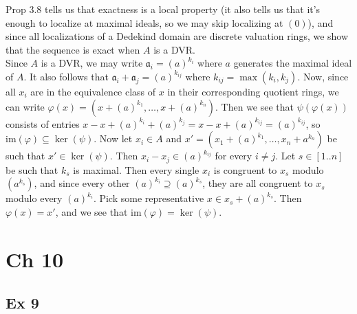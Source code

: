 \documentclass{article}
\let\temp\phi
\let\phi\varphi
\let\varphi\temp
\theoremstyle{definition}
\newcommand{\im}{\text{im}}
\begin{document}
Prop 3.8 tells us that exactness is a local property (it also tells us that
it's enough to localize at maximal ideals, so we may skip localizing at $(0)$),
and since all localizations of a Dedekind domain are discrete valuation rings,
we show that the sequence is exact when $A$ is a DVR. \\

Since $A$ is a DVR, we may write $\mathfrak{a}_i = (a)^{k_i}$ where $a$
generates the maximal ideal of $A$. It also follows that $\mathfrak{a}_i +
\mathfrak{a}_j = (a)^{k_{ij}}$ where $k_{ij} = \max(k_i, k_j)$. Now, since all
$x_i$ are in the equivalence class of $x$ in their corresponding quotient
rings, we can write $\phi(x) = (x + (a)^{k_1}, \ldots, x + (a)^{k_n})$. Then we
see that $\psi(\phi(x))$ consists of entries $x - x + (a)^{k_i} + (a)^{k_j} = x
- x + (a)^{k_{ij}} = (a)^{k_{ij}}$, so $\im(\phi) \subseteq \ker(\psi)$. Now
let $x_i \in A$ and $x' = (x_1 + (a)^{k_1}, \ldots, x_n + a^{k_n})$ be such
that $x' \in \ker(\psi)$. Then $x_i - x_j \in (a)^{k_{ij}}$ for every $i \not =
j$. Let $s \in [1..n]$ be such that $k_s$ is maximal. Then every single $x_i$
is congruent to $x_s$ modulo $(a^{k_s})$, and since every other $(a)^{k_i}
\supseteq (a)^{k_s}$, they are all congruent to $x_s$ modulo every $(a)^{k_i}$.
Pick some representative $x \in x_s + (a)^{k_s}$. Then $\phi(x) = x'$, and we
see that $\im(\phi) = \ker(\psi)$.


\section*{Ch 10}

\subsection*{Ex 9}
\end{document}
